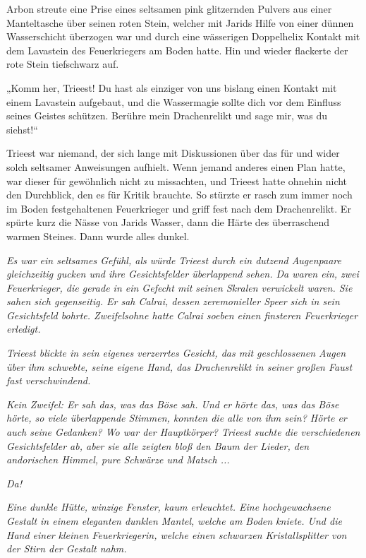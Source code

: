 Arbon streute eine Prise eines seltsamen pink glitzernden Pulvers aus einer Manteltasche über seinen roten Stein, welcher mit Jarids Hilfe von einer dünnen Wasserschicht überzogen war und durch eine wässerigen Doppelhelix Kontakt mit dem Lavastein des Feuerkriegers am Boden hatte. Hin und wieder flackerte der rote Stein tiefschwarz auf.

„Komm her, Trieest! Du hast als einziger von uns bislang einen Kontakt mit einem Lavastein aufgebaut, und die Wassermagie sollte dich vor dem Einfluss seines Geistes schützen. Berühre mein Drachenrelikt und sage mir, was du siehst!“

Trieest war niemand, der sich lange mit Diskussionen über das für und wider solch seltsamer Anweisungen aufhielt. Wenn jemand anderes einen Plan hatte, war dieser für gewöhnlich nicht zu missachten, und Trieest hatte ohnehin nicht den Durchblick, den es für Kritik brauchte. So stürzte er rasch zum immer noch im Boden festgehaltenen Feuerkrieger und griff fest nach dem Drachenrelikt. Er spürte kurz die Nässe von Jarids Wasser, dann die Härte des überraschend warmen Steines. Dann wurde alles dunkel.\bigskip



\textit{Es war ein seltsames Gefühl, als würde Trieest durch ein dutzend Augenpaare gleichzeitig gucken und ihre Gesichtsfelder überlappend sehen. Da waren ein, zwei Feuerkrieger, die gerade in ein Gefecht mit seinen Skralen verwickelt waren. Sie sahen sich gegenseitig. Er sah Calrai, dessen zeremonieller Speer sich in sein Gesichtsfeld bohrte. Zweifelsohne hatte Calrai soeben einen finsteren Feuerkrieger erledigt.}

\textit{Trieest blickte in sein eigenes verzerrtes Gesicht, das mit geschlossenen Augen über ihm schwebte, seine eigene Hand, das Drachenrelikt in seiner großen Faust fast verschwindend.}

\textit{Kein Zweifel: Er sah das, was das Böse sah. Und er hörte das, was das Böse hörte, so viele überlappende Stimmen, konnten die alle von ihm sein? Hörte er auch seine Gedanken? Wo war der Hauptkörper? Trieest suchte die verschiedenen Gesichtsfelder ab, aber sie alle zeigten bloß den Baum der Lieder, den andorischen Himmel, pure Schwärze und Matsch ...}

\textit{Da!}

\textit{Eine dunkle Hütte, winzige Fenster, kaum erleuchtet. Eine hochgewachsene Gestalt in einem eleganten dunklen Mantel, welche am Boden kniete. Und die Hand einer kleinen Feuerkriegerin, welche einen schwarzen Kristallsplitter von der Stirn der Gestalt nahm.}

